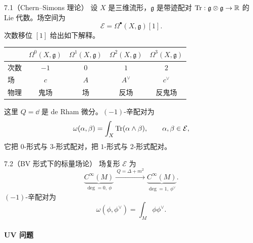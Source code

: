 \begin{wexam}{7.1}（Chern--Simons 理论）
  设 $X$ 是三维流形，$\mathfrak{g}$ 是带迹配对
  $\operatorname{Tr}:\mathfrak{g}\otimes\mathfrak{g}\to\mathbb{R}$ 的 Lie 代数。场空间为
  \[
    \mathcal{E}=\Omega^{\bullet}(X,\mathfrak{g})[1].
  \]
  次数移位 $[1]$ 给出如下解释。
  \begin{center}
    \begin{tabular}{lcccc}
      \toprule
       & $\Omega^0(X,\mathfrak{g})$ & $\Omega^1(X,\mathfrak{g})$
       & $\Omega^2(X,\mathfrak{g})$ & $\Omega^3(X,\mathfrak{g})$\\
      \midrule
      次数 & $-1$ & $0$ & $1$ & $2$\\
      场 & $c$ & $A$ & $A^{\vee}$ & $c^{\vee}$\\
      物理 & 鬼场 & 场 & 反场 & 反鬼场\\
      \bottomrule
    \end{tabular}
  \end{center}
  这里 $Q=\dd$ 是 de Rham 微分。$(-1)$-辛配对为
  \[
    \omega(\alpha,\beta)=\int_X\operatorname{Tr}(\alpha\wedge\beta),
    \qquad \alpha,\beta\in\mathcal{E},
  \]
  它把 $0$-形式与 $3$-形式配对，把 $1$-形式与 $2$-形式配对。
\end{wexam}

\begin{wexam}{7.2}（BV 形式下的标量场论）
  场复形 $\mathcal{E}$ 为
  \[
    \underbrace{C^{\infty}(M)}_{\deg=0,\ \phi}
    \xrightarrow{\ Q=\Delta+m^2\ }
    \underbrace{C^{\infty}(M)}_{\deg=1,\ \phi^{\vee}} .
  \]
  $(-1)$-辛配对为
  \[
    \omega(\phi,\phi^{\vee})=\int_M\phi\phi^{\vee}.
  \]
\end{wexam}



\paragraph{UV 问题}

